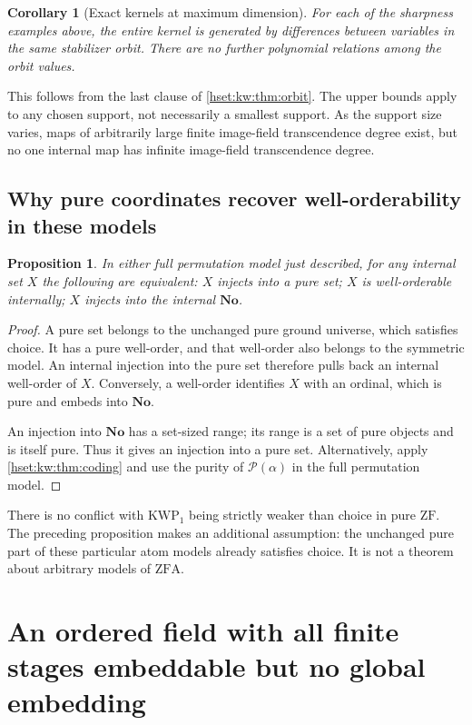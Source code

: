 \documentclass[11pt,letterpaper]{article}
\newtheorem{proposition}[proposition]{Proposition}\aliascntresetthe{proposition}
\newtheorem{corollary}[corollary]{Corollary}\aliascntresetthe{corollary}
\theoremstyle{definition}
\theoremstyle{remark}
\newcommand{\No}{\mathbf{No}}
\newcommand{\Pow}{\mathcal P}
\newcommand{\ZF}{\mathrm{ZF}}
\newcommand{\ZFA}{\mathrm{ZFA}}
\newcommand{\KWP}{\mathrm{KWP}}
\begin{document}
\begin{corollary}[Exact kernels at maximum dimension]\label{hset:kw:cor:sharpkernel}
For each of the sharpness examples above, the entire kernel is generated by differences between variables in the same stabilizer orbit. There are no further polynomial relations among the orbit values.
\end{corollary}
This follows from the last clause of \cref{hset:kw:thm:orbit}. The upper bounds apply to any chosen support, not necessarily a smallest support. As the support size varies, maps of arbitrarily large finite image-field transcendence degree exist, but no one internal map has infinite image-field transcendence degree.

\subsection{Why pure coordinates recover well-orderability in these models}
\begin{proposition}\label{hset:kw:prop:purewellorder}
In either full permutation model just described, for any internal set $X$ the following are equivalent: $X$ injects into a pure set; $X$ is well-orderable internally; $X$ injects into the internal $\No$.
\end{proposition}
\begin{proof}
A pure set belongs to the unchanged pure ground universe, which satisfies choice. It has a pure well-order, and that well-order also belongs to the symmetric model. An internal injection into the pure set therefore pulls back an internal well-order of $X$. Conversely, a well-order identifies $X$ with an ordinal, which is pure and embeds into $\No$.

An injection into $\No$ has a set-sized range; its range is a set of pure objects and is itself pure. Thus it gives an injection into a pure set. Alternatively, apply \cref{hset:kw:thm:coding} and use the purity of $\Pow(\alpha)$ in the full permutation model.
\end{proof}
There is no conflict with $\KWP_1$ being strictly weaker than choice in pure $\ZF$. The preceding proposition makes an additional assumption: the unchanged pure part of these particular atom models already satisfies choice. It is not a theorem about arbitrary models of $\ZFA$.

\section{An ordered field with all finite stages embeddable but no global embedding}
\label{hset:kw:sec:counterexample}
\end{document}
